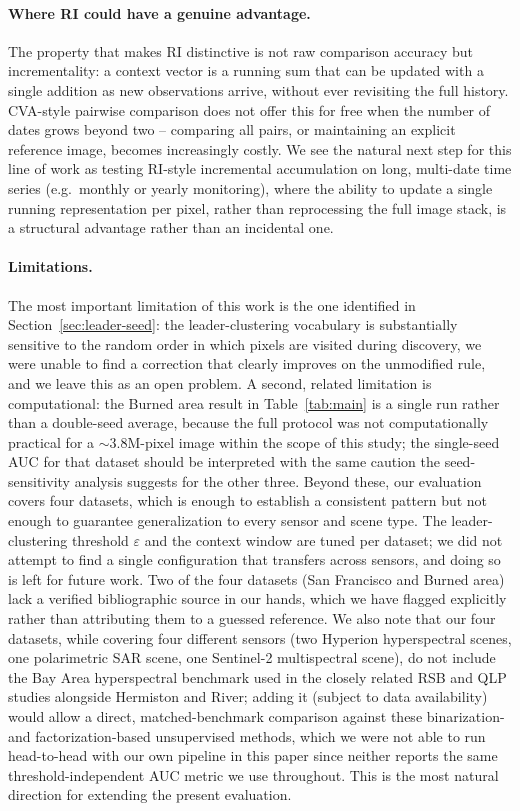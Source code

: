 \documentclass[11pt]{article}
\begin{document}
\paragraph{Where RI could have a genuine advantage.} The property that makes RI distinctive is not raw comparison accuracy but incrementality: a context vector is a running sum that can be updated with a single addition as new observations arrive, without ever revisiting the full history. CVA-style pairwise comparison does not offer this for free when the number of dates grows beyond two -- comparing all pairs, or maintaining an explicit reference image, becomes increasingly costly. We see the natural next step for this line of work as testing RI-style incremental accumulation on long, multi-date time series (e.g.\ monthly or yearly monitoring), where the ability to update a single running representation per pixel, rather than reprocessing the full image stack, is a structural advantage rather than an incidental one.

\paragraph{Limitations.}
\label{sec:limitations}
The most important limitation of this work is the one identified in Section~\ref{sec:leader-seed}: the leader-clustering vocabulary is substantially sensitive to the random order in which pixels are visited during discovery, we were unable to find a correction that clearly improves on the unmodified rule, and we leave this as an open problem. A second, related limitation is computational: the Burned area result in Table~\ref{tab:main} is a single run rather than a double-seed average, because the full protocol was not computationally practical for a $\sim\!3.8$M-pixel image within the scope of this study; the single-seed AUC for that dataset should be interpreted with the same caution the seed-sensitivity analysis suggests for the other three. Beyond these, our evaluation covers four datasets, which is enough to establish a consistent pattern but not enough to guarantee generalization to every sensor and scene type. The leader-clustering threshold $\varepsilon$ and the context window are tuned per dataset; we did not attempt to find a single configuration that transfers across sensors, and doing so is left for future work. Two of the four datasets (San Francisco and Burned area) lack a verified bibliographic source in our hands, which we have flagged explicitly rather than attributing them to a guessed reference. We also note that our four datasets, while covering four different sensors (two Hyperion hyperspectral scenes, one polarimetric SAR scene, one Sentinel-2 multispectral scene), do not include the Bay Area hyperspectral benchmark used in the closely related RSB and QLP studies \citep{falini2022rsb,falini2024qlp} alongside Hermiston and River; adding it (subject to data availability) would allow a direct, matched-benchmark comparison against these binarization- and factorization-based unsupervised methods, which we were not able to run head-to-head with our own pipeline in this paper since neither reports the same threshold-independent AUC metric we use throughout. This is the most natural direction for extending the present evaluation.
\end{document}
